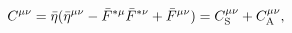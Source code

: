 \begin{equation}\label{metc}
C^{\mu\nu} = {\bar \eta}(\bar \eta^{\mu\nu} - 
{\bar F}^{*\mu}{\bar F}^{*\nu}
+ {\bar F^{\mu\nu}})
=C^{\mu\nu}_{{\rm S}} + C^{\mu\nu}_{{\rm A}},
\end{equation}

